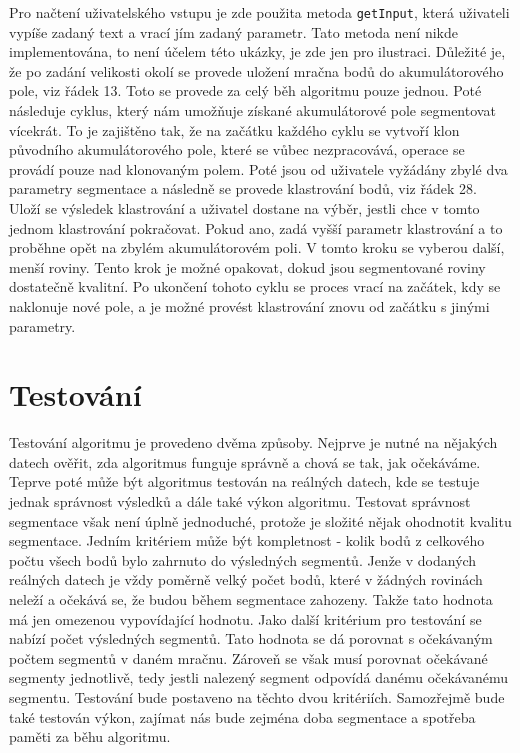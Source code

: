 \documentclass[11pt,twoside,a4paper]{book}
\begin{document}
Pro načtení uživatelského vstupu je zde použita metoda \verb|getInput|, která uživateli vypíše zadaný text a vrací jím zadaný parametr. Tato metoda není nikde implementována, to není účelem této ukázky, je zde jen pro ilustraci. Důležité je, že po zadání velikosti okolí se provede uložení mračna bodů do akumulátorového pole, viz řádek 13. Toto se provede za celý běh algoritmu pouze jednou.  Poté následuje cyklus, který nám umožňuje získané akumulátorové pole segmentovat vícekrát. To je zajištěno tak, že na začátku každého cyklu se vytvoří klon původního akumulátorového pole, které se vůbec nezpracovává, operace se provádí pouze nad klonovaným polem. Poté jsou od uživatele vyžádány zbylé dva parametry segmentace a následně se provede klastrování bodů, viz řádek 28. Uloží se výsledek klastrování a uživatel dostane na výběr, jestli chce v tomto jednom klastrování pokračovat. Pokud ano, zadá vyšší parametr klastrování a to proběhne opět na zbylém akumulátorovém poli. V tomto kroku se vyberou další, menší roviny. Tento krok je možné opakovat, dokud jsou segmentované roviny dostatečně kvalitní. Po ukončení tohoto cyklu se proces vrací na začátek, kdy se naklonuje nové pole, a je možné provést klastrování znovu od začátku s jinými parametry.


\chapter{Testování}
\label{chap:test}

Testování algoritmu je provedeno dvěma způsoby. Nejprve je nutné na nějakých  datech ověřit, zda algoritmus funguje správně a chová se tak, jak očekáváme. Teprve poté může být algoritmus testován na reálných datech, kde se testuje jednak správnost výsledků a dále také výkon algoritmu. Testovat správnost segmentace však není úplně jednoduché, protože je složité nějak ohodnotit kvalitu segmentace. Jedním kritériem může být kompletnost - kolik bodů z celkového počtu všech bodů bylo zahrnuto do výsledných segmentů. Jenže v dodaných reálných datech je vždy poměrně velký počet bodů, které v žádných rovinách neleží a očekává se, že budou během segmentace zahozeny. Takže tato hodnota má jen omezenou vypovídající hodnotu. Jako další kritérium pro testování se nabízí počet výsledných segmentů. Tato hodnota se dá porovnat s očekávaným počtem segmentů v daném mračnu. Zároveň se však musí porovnat očekávané segmenty jednotlivě, tedy jestli nalezený segment odpovídá danému očekávanému segmentu. Testování bude postaveno na těchto dvou kritériích. Samozřejmě bude také testován výkon, zajímat nás bude zejména doba segmentace a spotřeba paměti za běhu algoritmu.
\end{document}
